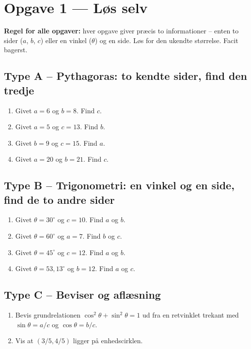 \section{Opgave 1 --- Løs selv}

\noindent
\textbf{Regel for alle opgaver:} hver opgave giver præcis to informationer -- enten to sider ($a$, $b$, $c$) eller en vinkel ($\theta$) og en side. Løs for den ukendte størrelse. Facit bagerst.

\subsection*{Type A -- Pythagoras: to kendte sider, find den tredje}

\begin{enumerate}
  \item Givet $a=6$ og $b=8$. Find $c$.
  \item Givet $a=5$ og $c=13$. Find $b$.
  \item Givet $b=9$ og $c=15$. Find $a$.
  \item Givet $a=20$ og $b=21$. Find $c$.
\end{enumerate}

\subsection*{Type B -- Trigonometri: en vinkel og en side, find de to andre sider}

\begin{enumerate}[resume]
  \item Givet $\theta=30^{\circ}$ og $c=10$. Find $a$ og $b$.
  \item Givet $\theta=60^{\circ}$ og $a=7$. Find $b$ og $c$.
  \item Givet $\theta=45^{\circ}$ og $c=12$. Find $a$ og $b$.
  \item Givet $\theta=53{,}13^{\circ}$ og $b=12$. Find $a$ og $c$.
\end{enumerate}

\subsection*{Type C -- Beviser og aflæsning}

\begin{enumerate}[resume]
  \item Bevis grundrelationen $\cos^{2}\theta+\sin^{2}\theta=1$ ud fra en retvinklet trekant med $\sin\theta=a/c$ og $\cos\theta=b/c$.
  \item Vis at $(3/5,4/5)$ ligger på enhedscirklen.
\end{enumerate}
